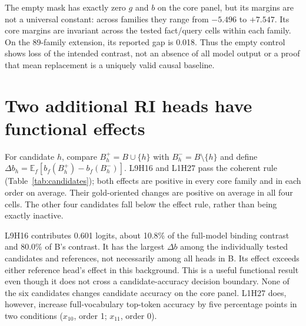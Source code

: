 \documentclass[11pt,a4paper]{article}
\begin{document}
\begin{table}[htbp]\centering\small

\caption{Mean core margins. Correct signs in column order are $(+,-,-,+)$.
The C50 sign pattern largely changes with order rather than with the question.}
\label{tab:cells}
\end{table}

The empty mask has exactly zero $g$ and $b$ on the core panel, but its margins are
not a universal constant: across families they range from $-5.496$ to $+7.547$.
Its core margins are invariant across the tested fact/query cells within each
family. On the 89-family extension, its reported gap is 0.018. Thus the empty
control shows loss of the intended contrast, not an absence of all model output
or a proof that mean replacement is a uniquely valid causal baseline.

\section{Two additional RI heads have functional effects}
For candidate $h$, compare $B_h^+=B\cup\{h\}$ with
$B_h^-=B\setminus\{h\}$ and define
$\Delta b_h=\mathbb{E}_f[b_f(B_h^+)-b_f(B_h^-)]$.
L9H16 and L1H27 pass the coherent rule (Table~\ref{tab:candidates}); both effects
are positive in every core family and in each order on average. Their
gold-oriented changes are positive on average in all four cells. The other four
candidates fall below the effect rule, rather than being exactly inactive.

\begin{table}[htbp]\centering\scriptsize
\setlength{\tabcolsep}{4pt}

\caption{Core functional contributions. Sign is the number of families agreeing
with the mean sign. Reference heads and joint RI removal calibrate the candidate
measurements; they are not part of the six-candidate route search.}
\label{tab:candidates}
\end{table}

L9H16 contributes 0.601 logits, about 10.8\% of the full-model binding contrast
and 80.0\% of B's contrast. It has the largest $\Delta b$ among the individually
tested candidates and references, not necessarily among all heads in B.
Its effect exceeds either reference head's effect in this background. This is a
useful functional result even though it does not cross a candidate-accuracy
decision boundary. None of the six candidates changes candidate accuracy on the
core panel. L1H27 does, however, increase full-vocabulary top-token accuracy by
five percentage points in two conditions ($x_{10}$, order 1; $x_{11}$, order 0).
\end{document}
